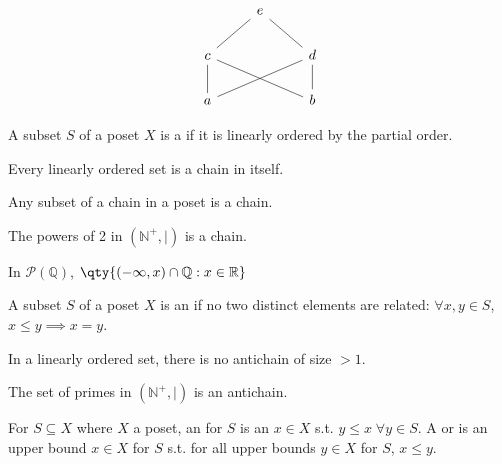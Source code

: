 \begin{example}
\begin{enumerate}
        \[\begin{tikzcd}
            & e \\
            c && d \\
            a && b
            \arrow[no head, from=3-1, to=2-1]
            \arrow[no head, from=2-1, to=1-2]
            \arrow[no head, from=3-3, to=2-3]
            \arrow[no head, from=2-3, to=1-2]
            \arrow[no head, from=3-1, to=2-3]
            \arrow[no head, from=3-3, to=2-1]
        \end{tikzcd}\]
    \end{enumerate}
\end{example}

\begin{definition}[Chain]
    A subset $S$ of a poset $X$ is a  if it is linearly ordered by the partial order.
\end{definition}

\begin{example}
    Every linearly ordered set is a chain in itself.
\end{example}

\begin{example}
    Any subset of a chain in a poset is a chain.
\end{example}

\begin{example}
    The powers of 2 in $(\mathbb N^+, \mid)$ is a chain.
\end{example}

\begin{example}
    In $\mathcal{P}(\mathbb{Q})$, $\qty{(-\infty, x) \cap \mathbb{Q} : x \in \mathbb{R}}$
\end{example}

\begin{definition}[Antichain]
    A subset $S$ of a poset $X$ is an  if no two distinct elements are related: $\forall x, y \in S$, $x \leq y \implies x = y$.
\end{definition}

\begin{example}
    In a linearly ordered set, there is no antichain of size $> 1$.
\end{example}

\begin{example}
    The set of primes in $(\mathbb N^+, \mid)$ is an antichain.
\end{example}

\begin{definition}[Supremum]
    For $S \subseteq X$ where $X$ a poset, an  for $S$ is an $x \in X$ s.t. $y \leq x \; \forall y \in S$.
    A  or  is an upper bound $x \in X$ for $S$ s.t. for all upper bounds $y \in X$ for $S$, $x \leq y$.
\end{definition}


